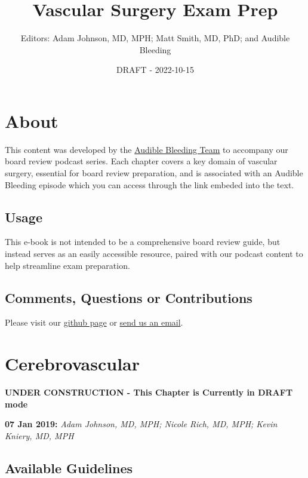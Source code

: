 \documentclass[
]{book}
\title{Vascular Surgery Exam Prep}
\author{Editors: Adam Johnson, MD, MPH; Matt Smith, MD, PhD; and Audible Bleeding}
\date{DRAFT - 2022-10-15}
\begin{document}
\maketitle

{
\setcounter{tocdepth}{1}
\tableofcontents
}
\hypertarget{about}{%
\chapter{About}\label{about}}

This content was developed by the \href{https://www.audiblebleeding.com/about-1/}{Audible Bleeding Team} to accompany our board review podcast series.
Each chapter covers a key domain of vascular surgery, essential for board review preparation, and is associated with an Audible Bleeding episode which you can access through the link embeded into the text.

\hypertarget{usage}{%
\section{Usage}\label{usage}}

This e-book is not intended to be a comprehensive board review guide, but instead serves as an easily accessible resource, paired with our podcast content to help streamline exam preparation.

\hypertarget{comments-questions-or-contributions}{%
\section{Comments, Questions or Contributions}\label{comments-questions-or-contributions}}

Please visit our \href{https://github.com/adam-mdmph/VS-Exam-Prep}{github page} or \href{mailto:audiblebleeding@vascularsociety.org}{send us an email}.

\hypertarget{cerebrovascular}{%
\chapter{Cerebrovascular}\label{cerebrovascular}}

\textbf{UNDER CONSTRUCTION - This Chapter is Currently in DRAFT mode}

\textbf{07 Jan 2019:} \emph{Adam Johnson, MD, MPH; Nicole Rich, MD, MPH; Kevin
Kniery, MD, MPH}

\hypertarget{available-guidelines}{%
\section{Available Guidelines}\label{available-guidelines}}
\end{document}
